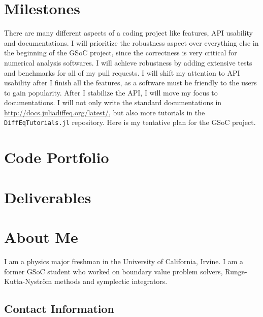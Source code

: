 \documentclass[12pt]{article}
\begin{document}
\section{Milestones}
There are many different aspects of a coding project like features, API
usability and documentations. I will prioritize the robustness aspect over
everything else in the beginning of the GSoC project, since the correctness is
very critical for numerical analysis softwares. I will achieve robustness by
adding extensive tests and benchmarks for all of my pull requests. I will shift
my attention to API usability after I finish all the features, as a software
must be friendly to the users to gain popularity. After I stabilize the API, I
will move my focus to documentations. I will not only write the standard
documentations in \url{http://docs.juliadiffeq.org/latest/}, but also more
tutorials in the \texttt{DiffEqTutorials.jl} repository. Here is my tentative
plan for the GSoC project.




\section{Code Portfolio}

\section{Deliverables}


\section{About Me}
I am a physics major freshman in the University of California, Irvine. I am a
former GSoC student who worked on boundary value problem solvers,
Runge-Kutta-Nystr{\"o}m methods and symplectic integrators.

\subsection{Contact Information}
\end{document}
